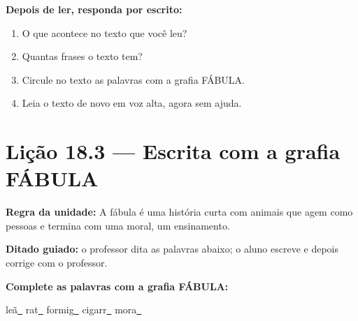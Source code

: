 \textbf{Depois de ler, responda por escrito:}
\begin{enumerate}

  \item O que acontece no texto que você leu?
  \begin{center}
  \underline{\hspace{12cm}}
  \end{center}

  \item Quantas frases o texto tem?
  \begin{center}
  \underline{\hspace{12cm}}
  \end{center}

  \item Circule no texto as palavras com a grafia FÁBULA.

  \item Leia o texto de novo em voz alta, agora sem ajuda.

\end{enumerate}

\section{Lição 18.3 --- Escrita com a grafia FÁBULA}

\noindent\textbf{Regra da unidade:} A fábula é uma história curta com animais que agem como pessoas e termina com uma moral, um ensinamento.


\noindent\textbf{Ditado guiado:} o professor dita as palavras abaixo; o aluno escreve e depois corrige com o professor.

\begin{center}
  \underline{\hspace{2.3cm}} \quad \underline{\hspace{2.3cm}} \quad \underline{\hspace{2.3cm}} \quad \underline{\hspace{2.3cm}}

  \underline{\hspace{2.3cm}} \quad \underline{\hspace{2.3cm}} \quad \underline{\hspace{2.3cm}} \quad \underline{\hspace{2.3cm}}
\end{center}

\noindent\textbf{Complete as palavras com a grafia FÁBULA:}
\begin{center}
  leã\underline{~} \quad rat\underline{~} \quad formig\underline{~} \quad cigarr\underline{~} \quad mora\underline{~}
\end{center}

